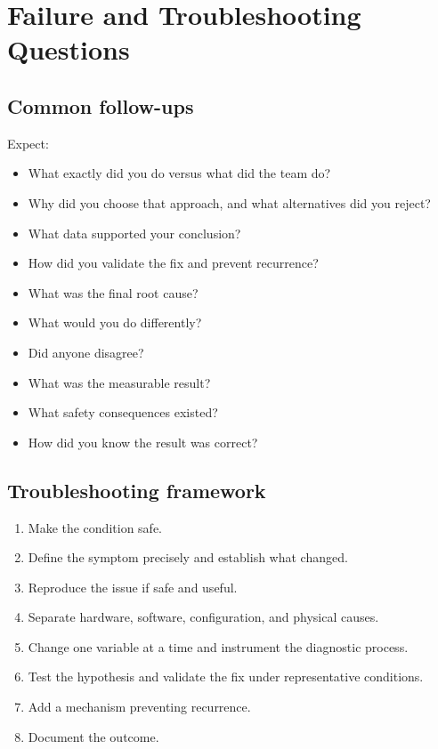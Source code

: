 \documentclass[11pt]{article}
\begin{document}
\section{Failure and Troubleshooting Questions}

\subsection{Common follow-ups}
Expect:
\begin{itemize}
  \item What exactly did you do versus what did the team do?
  \item Why did you choose that approach, and what alternatives did you reject?
  \item What data supported your conclusion?
  \item How did you validate the fix and prevent recurrence?
  \item What was the final root cause?
  \item What would you do differently?
  \item Did anyone disagree?
  \item What was the measurable result?
  \item What safety consequences existed?
  \item How did you know the result was correct?
\end{itemize}

\subsection{Troubleshooting framework}
\begin{enumerate}
  \item Make the condition safe.
  \item Define the symptom precisely and establish what changed.
  \item Reproduce the issue if safe and useful.
  \item Separate hardware, software, configuration, and physical causes.
  \item Change one variable at a time and instrument the diagnostic process.
  \item Test the hypothesis and validate the fix under representative conditions.
  \item Add a mechanism preventing recurrence.
  \item Document the outcome.
\end{enumerate}
\end{document}

